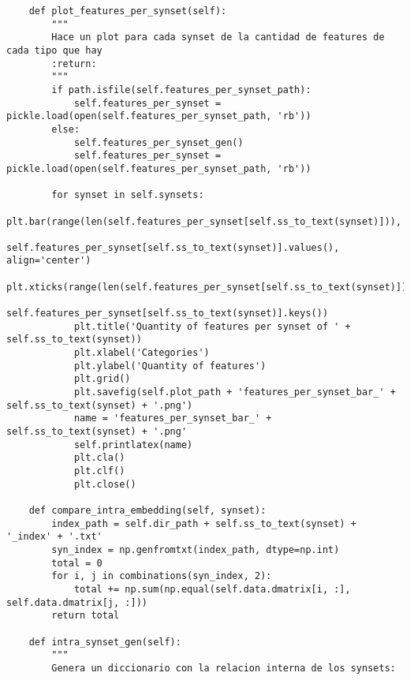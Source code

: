 \documentclass[12,twoside]{TFG-GM}
\theoremstyle{definition}
\theoremstyle{remark}
\begin{document}
\begin{verbatim}
    def plot_features_per_synset(self):
        """
        Hace un plot para cada synset de la cantidad de features de cada tipo que hay
        :return:
        """
        if path.isfile(self.features_per_synset_path):
            self.features_per_synset = pickle.load(open(self.features_per_synset_path, 'rb'))
        else:
            self.features_per_synset_gen()
            self.features_per_synset = pickle.load(open(self.features_per_synset_path, 'rb'))

        for synset in self.synsets:
            plt.bar(range(len(self.features_per_synset[self.ss_to_text(synset)])),
                    self.features_per_synset[self.ss_to_text(synset)].values(), align='center')
            plt.xticks(range(len(self.features_per_synset[self.ss_to_text(synset)])),
                       self.features_per_synset[self.ss_to_text(synset)].keys())
            plt.title('Quantity of features per synset of ' + self.ss_to_text(synset))
            plt.xlabel('Categories')
            plt.ylabel('Quantity of features')
            plt.grid()
            plt.savefig(self.plot_path + 'features_per_synset_bar_' + self.ss_to_text(synset) + '.png')
            name = 'features_per_synset_bar_' + self.ss_to_text(synset) + '.png'
            self.printlatex(name)
            plt.cla()
            plt.clf()
            plt.close()

    def compare_intra_embedding(self, synset):
        index_path = self.dir_path + self.ss_to_text(synset) + '_index' + '.txt'
        syn_index = np.genfromtxt(index_path, dtype=np.int)
        total = 0
        for i, j in combinations(syn_index, 2):
            total += np.sum(np.equal(self.data.dmatrix[i, :], self.data.dmatrix[j, :]))
        return total

    def intra_synset_gen(self):
        """
        Genera un diccionario con la relacion interna de los synsets:


\end{verbatim}
\end{document}
